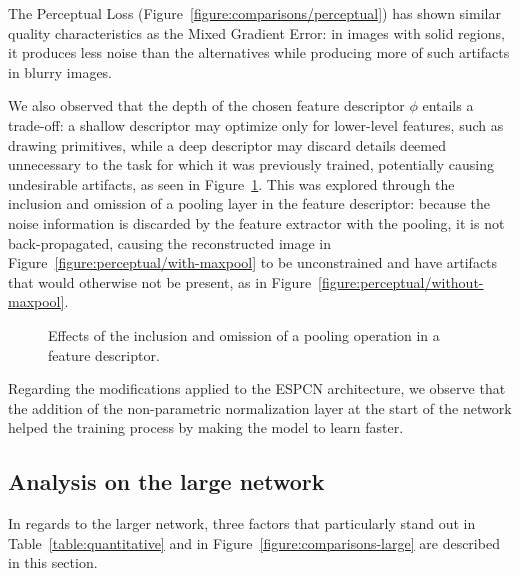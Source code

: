 The Perceptual Loss (Figure~\ref{figure:comparisons/perceptual}) has shown similar quality characteristics as the Mixed Gradient Error: in images with solid regions, it produces less noise than the alternatives while producing more of such artifacts in blurry images.

We also observed that the depth of the chosen feature descriptor $\phi$ entails a trade-off: a shallow descriptor may optimize only for lower-level features, such as drawing primitives, while a deep descriptor may discard details deemed unnecessary to the task for which it was previously trained, potentially causing undesirable artifacts, as seen in Figure~\ref{figure:perceptual/comparison}. 
This was explored through the inclusion and omission of a pooling layer in the feature descriptor: because the noise information is discarded by the feature extractor with the pooling, it is not back-propagated, causing the reconstructed image in Figure~\ref{figure:perceptual/with-maxpool} to be unconstrained and have artifacts that would otherwise not be present, as in Figure~\ref{figure:perceptual/without-maxpool}.

\begin{figure}[htbp]
    \centering
    \label{figure:perceptual/comparison}

    \caption{
        Effects of the inclusion and omission of a pooling operation in a feature descriptor.
    }
\end{figure}

Regarding the modifications applied to the ESPCN architecture, we observe that the addition of the non-parametric normalization layer at the start of the network helped the training process by making the model to learn faster.

\subsection{\label{section:analysis-large-network}Analysis on the large network}

In regards to the larger network, three factors that particularly stand out in Table~\ref{table:quantitative} and in Figure~\ref{figure:comparisons-large} are described in this section.

